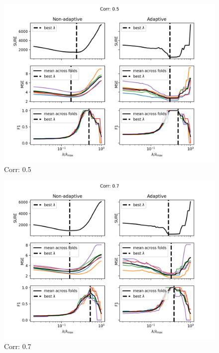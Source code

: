 \begin{figure}[h]
    \centering
    \includegraphics[]{../srcimages/sure_vs_mse_corr_50.png}
    \caption{Corr: 0.5}
    \label{fig:sure_vs_mse_corr_50}
\end{figure}

\begin{figure}[h]
    \centering
    \includegraphics[]{../srcimages/sure_vs_mse_corr_70.png}
    \caption{Corr: 0.7}
    \label{fig:sure_vs_mse_corr_70}
\end{figure}

